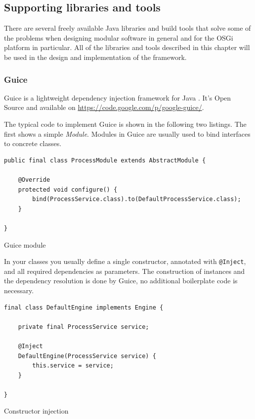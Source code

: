 \subsection{Supporting libraries and tools}
There are several freely available Java libraries and build tools that solve some of the problems when designing modular software in general and for the \gls{OSGi} platform in particular. All of the libraries and tools described in this chapter will be used in the design and implementation of the framework.

\subsubsection{Guice}
Guice is a lightweight dependency injection framework for Java \cite{Guice}. It's Open Source and available on \url{https://code.google.com/p/google-guice/}.

The typical code to implement Guice is shown in the following two listings. The first shows a simple \textit{Module}. Modules in Guice are usually used to bind interfaces to concrete classes.

\begin{listing}[H]
\begin{verbatim}
public final class ProcessModule extends AbstractModule {

    @Override 
    protected void configure() {
        bind(ProcessService.class).to(DefaultProcessService.class);
    }

}
\end{verbatim}
\caption{Guice module}
\end{listing}

In your classes you usually define a single constructor, annotated with \texttt{@Inject}, and all required dependencies as parameters. The construction of instances and the dependency resolution is done by Guice, no additional boilerplate code is necessary.

\begin{listing}[H]
\begin{verbatim}
final class DefaultEngine implements Engine {

    private final ProcessService service;

    @Inject
    DefaultEngine(ProcessService service) {
        this.service = service;
    }

}
\end{verbatim}
\caption{Constructor injection}
\end{listing}

